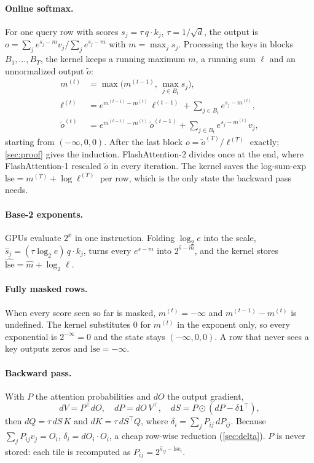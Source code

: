 \documentclass[10pt,twocolumn,letterpaper]{article}
\newcommand{\lse}{\widehat{\mathrm{lse}}}
\begin{document}
\paragraph{Online softmax.}
For one query row with scores $s_j = \tau\, q \cdot k_j$, $\tau = 1/\sqrt{d}$,
the output is $o = \sum_j e^{s_j - m} v_j / \sum_j e^{s_j - m}$ with
$m = \max_j s_j$. Processing the keys in blocks $B_1, \dots, B_T$, the kernel
keeps a running maximum $m$, a running sum $\ell$ and an unnormalized output
$\tilde{o}$:
\begin{align}
m^{(t)} &= \max\bigl(m^{(t-1)},\, \max_{j \in B_t} s_j\bigr), \nonumber\\
\ell^{(t)} &= e^{m^{(t-1)} - m^{(t)}}\, \ell^{(t-1)} + \textstyle\sum_{j \in B_t} e^{s_j - m^{(t)}}, \label{eq:online}\\
\tilde{o}^{(t)} &= e^{m^{(t-1)} - m^{(t)}}\, \tilde{o}^{(t-1)} + \textstyle\sum_{j \in B_t} e^{s_j - m^{(t)}} v_j, \nonumber
\end{align}
starting from $(-\infty, 0, 0)$. After the last block $o = \tilde{o}^{(T)} /
\ell^{(T)}$ exactly; \cref{sec:proof} gives the induction. FlashAttention-2
divides once at the end, where FlashAttention-1 rescaled $\tilde{o}$ in every
iteration. The kernel saves the log-sum-exp $\mathrm{lse} = m^{(T)} + \log
\ell^{(T)}$ per row, which is the only state the backward pass needs.

\paragraph{Base-2 exponents.}
GPUs evaluate $2^x$ in one instruction. Folding $\log_2 e$ into the scale,
$\hat{s}_j = (\tau \log_2 e)\, q \cdot k_j$, turns every $e^{s - m}$ into
$2^{\hat{s} - \hat{m}}$, and the kernel stores $\lse = \hat{m} + \log_2 \ell$.

\paragraph{Fully masked rows.}
When every score seen so far is masked, $m^{(t)} = -\infty$ and
$m^{(t-1)} - m^{(t)}$ is undefined. The kernel substitutes 0 for $m^{(t)}$ in
the exponent only, so every exponential is $2^{-\infty} = 0$ and the state
stays $(-\infty, 0, 0)$. A row that never sees a key outputs zeros and
$\mathrm{lse} = -\infty$.

\paragraph{Backward pass.}
With $P$ the attention probabilities and $dO$ the output gradient,
\begin{equation}
dV = P^\top dO,\quad dP = dO\,V^\top,\quad dS = P \odot (dP - \delta\mathbf{1}^\top),
\label{eq:bwd}
\end{equation}
then $dQ = \tau\, dS\, K$ and $dK = \tau\, dS^\top Q$, where
$\delta_i = \sum_j P_{ij}\, dP_{ij}$. Because $\sum_j P_{ij} v_j = O_i$,
$\delta_i = dO_i \cdot O_i$, a cheap row-wise reduction (\cref{sec:delta}).
$P$ is never stored: each tile is recomputed as
$P_{ij} = 2^{\hat{s}_{ij} - \lse_i}$.
\end{document}
